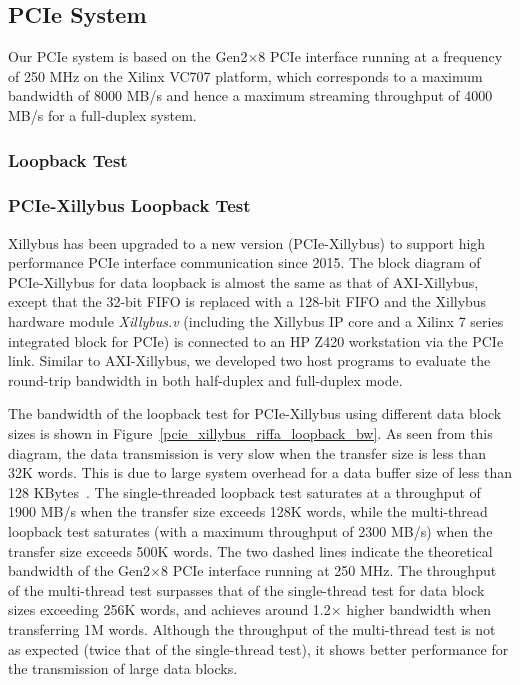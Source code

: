 \subsection{PCIe System}
Our PCIe system is based on the Gen2$\times$8 PCIe interface running at a frequency of 250 MHz on the Xilinx VC707 platform, which corresponds to a maximum bandwidth of 8000 MB/s and hence a maximum streaming throughput of 4000 MB/s for a full-duplex system. 


\subsubsection{Loopback Test}

\subsubsection{PCIe-Xillybus Loopback Test}
Xillybus has been upgraded to a new version (PCIe-Xillybus) to support high performance PCIe interface communication since 2015. 
The block diagram of PCIe-Xillybus for data loopback is almost the same as that of AXI-Xillybus, except that the 32-bit FIFO is replaced with a 128-bit FIFO and the Xillybus hardware module \textit{Xillybus.v} (including the Xillybus IP core and a Xilinx 7 series integrated block for PCIe) is connected to an HP Z420 workstation via the PCIe link. 
Similar to AXI-Xillybus, we developed two host programs to evaluate the round-trip bandwidth in both half-duplex and full-duplex mode. 

The bandwidth of the loopback test for PCIe-Xillybus using different data block sizes is shown in Figure~\ref{pcie_xillybus_riffa_loopback_bw}. 
As seen from this diagram, the data transmission is very slow when the transfer size is less than 32K words. 
This is due to large system overhead for a data buffer size of less than 128 KBytes~\cite{xillybus2018}. 
The single-threaded loopback test saturates at a throughput of 1900 MB/s when the transfer size exceeds 128K words, while the multi-thread loopback test saturates (with a maximum throughput of 2300 MB/s) when the transfer size exceeds 500K words. 
The two dashed lines indicate the theoretical bandwidth of the Gen2$\times$8 PCIe interface running at 250 MHz.
The throughput of the multi-thread test surpasses that of the single-thread test for data block sizes exceeding 256K words, and achieves around 1.2$\times$ higher bandwidth when transferring 1M words. 
Although the throughput of the multi-thread test is not as expected (twice that of the single-thread test), it shows better performance for the transmission of large data blocks. 

